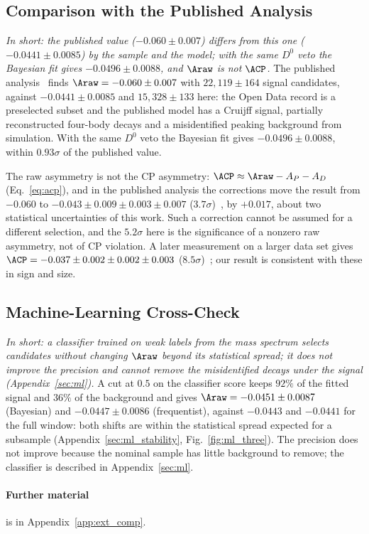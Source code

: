 \subsection{Comparison with the Published Analysis}
\label{sec:comparison_published}
\emph{In short: the published value ($-0.060\pm0.007$) differs from this one ($-0.0441\pm0.0085$) by the sample and the model; with the same $D^0$ veto the Bayesian fit gives $-0.0496\pm0.0088$, and $\Araw$ is not $\ACP$.}
The published analysis~\cite{lhcb_cpv_2013} finds $\Araw=-0.060\pm0.007$ with $22{,}119\pm164$ signal candidates, against $-0.0441\pm0.0085$ and $15{,}328\pm133$ here: the Open Data record is a preselected subset and the published model has a Cruijff signal, partially reconstructed four-body decays and a misidentified peaking background from simulation. With the same $D^0$ veto the Bayesian fit gives $-0.0496\pm0.0088$, within $0.93\sigma$ of the published value.

The raw asymmetry is not the CP asymmetry: $\ACP\approx\Araw-A_P-A_D$ (Eq.~\eqref{eq:acp}), and in the published analysis the corrections move the result from $-0.060$ to $-0.043\pm0.009\pm0.003\pm0.007$ ($3.7\sigma$)~\cite{lhcb_cpv_2013}, by $+0.017$, about two statistical uncertainties of this work. Such a correction cannot be assumed for a different selection, and the $5.2\sigma$ here is the significance of a nonzero raw asymmetry, not of CP violation. A later measurement on a larger data set gives $\ACP=-0.037\pm0.002\pm0.002\pm0.003$ ($8.5\sigma$)~\cite{lhcb_cpv_prd2023,lhcb_cpv_paper}; our result is consistent with these in sign and size.

\subsection{Machine-Learning Cross-Check}
\label{sec:comparison_mlcheck}
\emph{In short: a classifier trained on weak labels from the mass spectrum selects candidates without changing $\Araw$ beyond its statistical spread; it does not improve the precision and cannot remove the misidentified decays under the signal (Appendix~\ref{sec:ml}).}
A cut at $0.5$ on the classifier score keeps $92\%$ of the fitted signal and $36\%$ of the background and gives $\Araw=-0.0451\pm0.0087$ (Bayesian) and $-0.0447\pm0.0086$ (frequentist), against $-0.0443$ and $-0.0441$ for the full window: both shifts are within the statistical spread expected for a subsample (Appendix~\ref{sec:ml_stability}, Fig.~\ref{fig:ml_three}). The precision does not improve because the nominal sample has little background to remove; the classifier is described in Appendix~\ref{sec:ml}.

\paragraph*{Further material} is in Appendix~\ref{app:ext_comp}.

